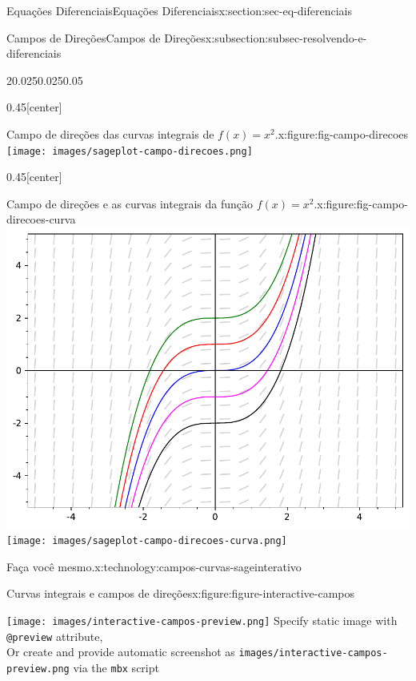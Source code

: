 \documentclass[oneside,10pt,]{article}
\newcommand{\mono}[1]{\texttt{#1}}
\numberwithin{equation}{section}
\newlength{\qrsize}
\newlength{\previewwidth}
\begin{document}
\begin{sectionptx}{Equações Diferenciais}{}{Equações Diferenciais}{}{}{x:section:sec-eq-diferenciais}
\begin{subsectionptx}{Campos de Direções}{}{Campos de Direções}{}{}{x:subsection:subsec-resolvendo-e-diferenciais}
\begin{sidebyside}{2}{0.025}{0.025}{0.05}
\begin{sbspanel}{0.45}[center]
\begin{figureptx}{Campo de direções das curvas integrais de \(f(x)=x^2\).}{x:figure:fig-campo-direcoes}{}
{\texttt{[image: images/sageplot-campo-direcoes.png]}}
\tcblower
\end{figureptx}%
\end{sbspanel}%
\begin{sbspanel}{0.45}[center]%
\begin{figureptx}{Campo de direções e as curvas integrais da função \(f(x)=x^2\).}{x:figure:fig-campo-direcoes-curva}{}%
%
{\includegraphics[width=\linewidth]{images/sageplot-campo-direcoes-curva.pdf}}%
{\texttt{[image: images/sageplot-campo-direcoes-curva.png]}}
\tcblower
\end{figureptx}%
\end{sbspanel}%
\end{sidebyside}%
\begin{technology}{Faça você mesmo.}{x:technology:campos-curvas-sageinterativo}%
\begin{figureptx}{Curvas integrais e campos de direções}{x:figure:figure-interactive-campos}{}%
\centering
\setlength{\qrsize}{9em}
\setlength{\previewwidth}{\linewidth}
\addtolength{\previewwidth}{-\qrsize}
\begin{tcbraster}[raster columns=2, raster column skip=1pt, raster halign=center, raster force size=false, raster left skip=0pt, raster right skip=0pt]%
\begin{tcolorbox}[previewstyle, width=\previewwidth]%
%
{\texttt{[image: images/interactive-campos-preview.png]}}%
{\small{}Specify static image with \mono{@preview} attribute,\\Or create and provide automatic screenshot as \mono{images/interactive-campos-preview.png} via the \mono{mbx} script}%

\end{tcolorbox}
\end{tcbraster}
\end{figureptx}
\end{technology}
\end{subsectionptx}
\end{sectionptx}
\end{document}
